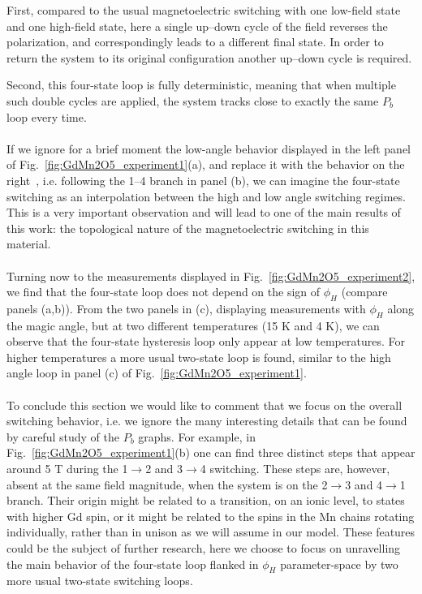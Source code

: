 First, compared to the usual magnetoelectric switching with one low-field state and one high-field state, here a single up--down cycle of the field reverses the polarization, and correspondingly leads to a different final state.
In order to return the system to its original configuration another up--down cycle is required.

Second, this four-state loop is fully deterministic, meaning that when multiple such double cycles are applied, the system tracks close to exactly the same $P_b$ loop every time.
\\\\
If we ignore for a brief moment the low-angle behavior displayed in the left panel of Fig.~\ref{fig:GdMn2O5_experiment1}(a), and replace it with the behavior on the right~\cite{Lee13}, i.e. following the 1--4 branch in panel (b), we can imagine the four-state switching as an interpolation between the high and low angle switching regimes.
This is a very important observation and will lead to one of the main results of this work: the topological nature of the magnetoelectric switching in this material.
\\\\
Turning now to the measurements displayed in Fig.~\ref{fig:GdMn2O5_experiment2}, we find that the four-state loop does not depend on the sign of $\phi_H$ (compare panels (a,b)).
From the two panels in (c), displaying measurements with $\phi_H$ along the magic angle, but at two different temperatures (15 K and 4 K), we can observe that the four-state hysteresis loop only appear at low temperatures.
For higher temperatures a more usual two-state loop is found, similar to the high angle loop in panel (c) of Fig.~\ref{fig:GdMn2O5_experiment1}.
\\\\
To conclude this section we would like to comment that we focus on the overall switching behavior, i.e. we ignore the many interesting details that can be found by careful study of the $P_b$ graphs.
For example, in Fig.~\ref{fig:GdMn2O5_experiment1}(b) one can find three distinct steps that appear around 5 T during the 1$\rightarrow$2 and 3$\rightarrow$4 switching.
These steps are, however, absent at the same field magnitude, when the system is on the 2$\rightarrow$3 and 4$\rightarrow$1 branch.
Their origin might be related to a transition, on an ionic level, to states with higher Gd spin, or it might be related to the spins in the Mn chains rotating individually, rather than in unison as we will assume in our model.
These features could be the subject of further research, here we choose to focus on unravelling the main behavior of the four-state loop flanked in $\phi_H$ parameter-space by two more usual two-state switching loops.

